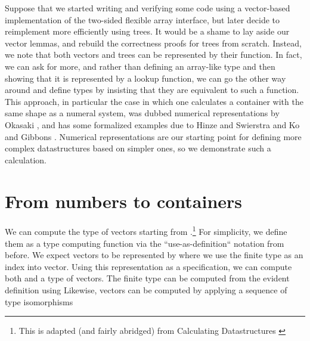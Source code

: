 
Suppose that we started writing and verifying some code using a vector-based implementation of the two-sided flexible array interface, but later decide to reimplement more efficiently using trees. It would be a shame to lay aside our vector lemmas, and rebuild the correctness proofs for trees from scratch. Instead, we note that both vectors and trees can be represented by their  function. In fact, we can ask for more, and rather than defining an array-like type and then showing that it is represented by a lookup function, we can go the other way around and define types by insisting that they are equivalent to such a function. This approach, in particular the case in which one calculates a container with the same shape as a numeral system, was dubbed numerical representations by Okasaki \cite{purelyfunctional}, and has some formalized examples due to Hinze and Swierstra \cite{calcdata} and Ko and Gibbons \cite{progorn}. Numerical representations are our starting point for defining more complex datastructures based on simpler ones, so we demonstrate such a calculation. 

\section{From numbers to containers}\label{sec:numrep}
We can compute the type of vectors starting from \bN{}.\footnote{This is adapted (and fairly abridged) from Calculating Datastructures \cite{calcdata}} For simplicity, we define them as a type computing function via the ``use-as-definition`` notation from before. We expect vectors to be represented by 
where we use the finite type  as an index into vector. Using this representation as a specification, we can compute both  and a type of vectors. The finite type can be computed from the evident definition
using
Likewise, vectors can be computed by applying a sequence of type isomorphisms

